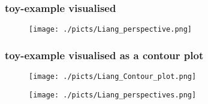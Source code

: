 \begin{frame}
		\frametitle{toy-example visualised}
	
	\begin{center}
		\begin{figure}\texttt{[image: ./picts/Liang\_perspective.png]}\end{figure}	
	\end{center}	
		
\end{frame}

\begin{frame}
		\frametitle{toy-example visualised as a contour plot}
	
	\begin{center}
		\begin{figure}\texttt{[image: ./picts/Liang\_Contour\_plot.png]}\end{figure}	
	\end{center}	
		
\end{frame}


\begin{frame}[plain]

	\begin{center}
		\begin{figure}\texttt{[image: ./picts/Liang\_perspectives.png]}\end{figure}	
	\end{center}	
		
\end{frame}



